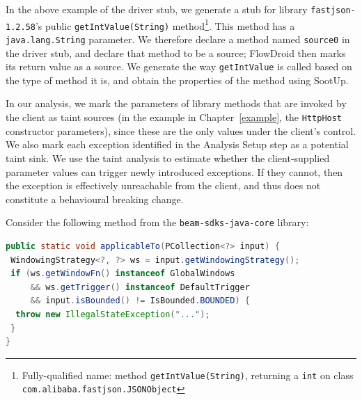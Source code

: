 In the above example of the driver stub, we generate a stub for library \texttt{fastjson-} \texttt{1.2.58}'s public \texttt{getIntValue(String)} method\footnote{Fully-qualified name: method \texttt{getIntValue(String)}, returning a \texttt{int} on class \texttt{com.alibaba.fastjson.JSONObject}}. This method has a \texttt{java.lang.String} parameter. We therefore declare a method named \texttt{source0} in the driver stub, and declare that method to be a source; FlowDroid then marks its return value as a source. We generate the way \texttt{getIntValue} is called based on the type of method it is, and obtain the properties of the method using SootUp.


In our analysis, we mark the parameters of library methods that are invoked by the client as taint sources (in the example in Chapter~\ref{example}, the \texttt{HttpHost} constructor parameters), since these are the only values under the client’s control. We also mark each exception identified in the Analysis Setup step as a potential taint sink. We use the taint analysis to estimate whether the client-supplied parameter values can trigger newly introduced exceptions. If they cannot, then the exception is effectively unreachable from the client, and thus does not constitute a behavioural breaking change. 



Consider the following method from the \texttt{beam-sdks-java-core} library:

\begin{lstlisting}[language=Java]
public static void applicableTo(PCollection<?> input) {
 WindowingStrategy<?, ?> ws = input.getWindowingStrategy();
 if (ws.getWindowFn() instanceof GlobalWindows
     && ws.getTrigger() instanceof DefaultTrigger
     && input.isBounded() != IsBounded.BOUNDED) {
  throw new IllegalStateException("...");
 }
}
\end{lstlisting}


